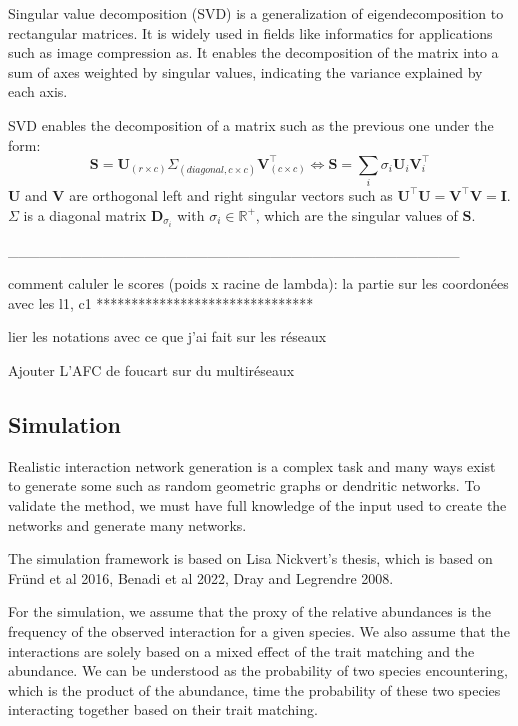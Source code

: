 Singular value decomposition (SVD) is a generalization of eigendecomposition to rectangular matrices. It is widely used in fields like informatics for applications such as image compression as. It enables the decomposition of the matrix into a sum of axes weighted by singular values, indicating the variance explained by each axis.


SVD enables the decomposition of a matrix such as the previous one under the form: 
$$
\textbf{S} = \textbf{U}_{(r\times c)} \Sigma_{(diagonal, c\times c)} \textbf{V}_{(c \times c)}^\intercal \Leftrightarrow \textbf{S} = \sum_i \sigma_i \textbf{U}_i \textbf{V}_i^\intercal
$$
$\textbf{U}$ and $\textbf{V}$ are orthogonal left and right singular vectors such as $\textbf{U}^\intercal\textbf{U} = \textbf{V}^\intercal\textbf{V} = \textbf{I}$. $\Sigma$ is a diagonal matrix $\textbf{D}_{\sigma_i}$ with $\sigma_i \in \mathbb{R}^+$, which are the singular values of $\textbf{S}$.



___________________________________________







comment caluler le scores (poids x racine de lambda): la partie sur les coordonées avec les l1, c1
*******************************


lier les notations avec ce que j'ai fait sur les réseaux

Ajouter L'AFC de foucart sur du multiréseaux

\subsection{Simulation}

Realistic interaction network generation is a complex task and many ways exist to generate some such as random geometric graphs or dendritic networks. To validate the method, we must have full knowledge of the input used to create the networks and generate many networks.

The simulation framework is based on Lisa Nickvert's thesis, which is based on Fründ et al 2016, Benadi et al 2022, Dray and Legrendre 2008.

For the simulation, we assume that the proxy of the relative abundances is the frequency of the observed interaction for a given species. We also assume that the interactions are solely based on a mixed effect of the trait matching and the abundance. We can be understood as the probability of two species encountering, which is the product of the abundance, time the probability of these two species interacting together based on their trait matching.

